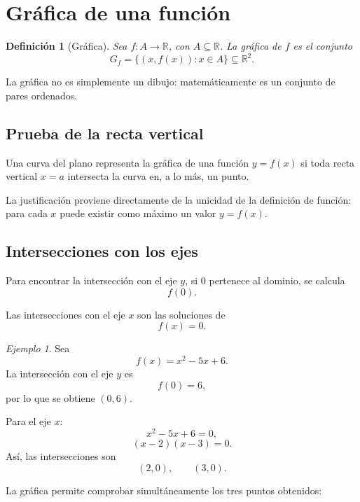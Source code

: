 \documentclass[12pt]{article}
\newtheorem{definicion}{Definición}[section]
\theoremstyle{remark}
\newtheorem{ejemplo}{Ejemplo}[section]
\newcommand{\R}{\mathbb{R}}
\begin{document}
\section{Gráfica de una función}

\begin{definicion}[Gráfica]
Sea $f:A\to\R$, con $A\subseteq\R$. La gráfica de $f$ es el conjunto
\[
G_f=\{(x,f(x)):x\in A\}\subseteq\R^2.
\]
\end{definicion}

La gráfica no es simplemente un dibujo: matemáticamente es un conjunto de
pares ordenados.

\subsection{Prueba de la recta vertical}

Una curva del plano representa la gráfica de una función $y=f(x)$ si toda
recta vertical $x=a$ intersecta la curva en, a lo más, un punto.

La justificación proviene directamente de la unicidad de la definición de
función: para cada $x$ puede existir como máximo un valor $y=f(x)$.

\subsection{Intersecciones con los ejes}

Para encontrar la intersección con el eje $y$, si $0$ pertenece al dominio, se
calcula
\[
f(0).
\]

Las intersecciones con el eje $x$ son las soluciones de
\[
f(x)=0.
\]

\begin{ejemplo}
Sea
\[
f(x)=x^2-5x+6.
\]
La intersección con el eje $y$ es
\[
f(0)=6,
\]
por lo que se obtiene $(0,6)$.

Para el eje $x$:
\[
x^2-5x+6=0,
\]
\[
(x-2)(x-3)=0.
\]
Así, las intersecciones son
\[
(2,0),\qquad(3,0).
\]

La gráfica permite comprobar simultáneamente los tres puntos obtenidos:
\begin{center}
\end{center}
\end{ejemplo}
\end{document}
